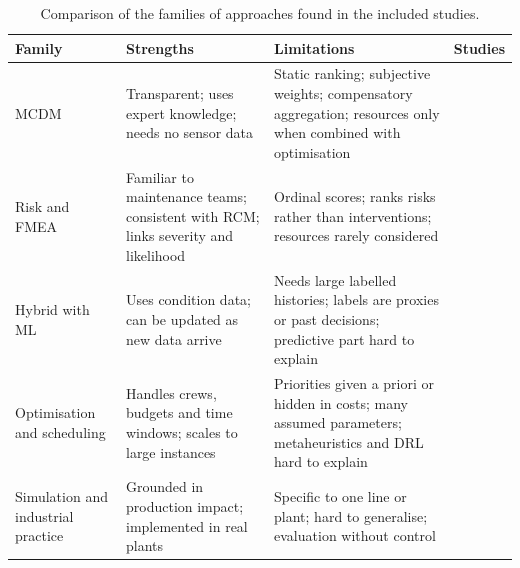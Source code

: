 \begin{table}[!htbp]
\centering
\caption{Comparison of the families of approaches found in the included studies.}
\label{tab:families}
\scriptsize
\begin{tabular}{|>{\raggedright\arraybackslash}p{1.6cm}|>{\raggedright\arraybackslash}p{3.1cm}|>{\raggedright\arraybackslash}p{3.3cm}|>{\raggedright\arraybackslash}p{2.4cm}|}
\hline
\textbf{Family} & \textbf{Strengths} & \textbf{Limitations} & \textbf{Studies} \\
\hline
MCDM & Transparent; uses expert knowledge; needs no sensor data & Static ranking; subjective weights; compensatory aggregation; resources only when combined with optimisation & \cite{ozcan2021,bulut2021,panwar2021,bahrami2021,enjavimadar2022,moradi2024,rios2025} \\
\hline
Risk and FMEA & Familiar to maintenance teams; consistent with RCM; links severity and likelihood & Ordinal scores; ranks risks rather than interventions; resources rarely considered & \cite{bahadir2026,qiu2026,shaulagara2023,zhou2024,hedayatnia2025} \\
\hline
Hybrid with ML & Uses condition data; can be updated as new data arrive & Needs large labelled histories; labels are proxies or past decisions; predictive part hard to explain & \cite{tang2026,darko2026,astepe2021,wehbi2026,danach2026,rios2024,wittbrodt2026} \\
\hline
Optimisation and scheduling & Handles crews, budgets and time windows; scales to large instances & Priorities given a priori or hidden in costs; many assumed parameters; metaheuristics and DRL hard to explain & \cite{schulze2022,geng2022,woller2023,gao2024,bi2022,dui2025,dui2026,li2027} \\
\hline
Simulation and industrial practice & Grounded in production impact; implemented in real plants & Specific to one line or plant; hard to generalise; evaluation without control & \cite{yang2021,gopalakrishnan2022,delgado2026,hall2021} \\
\hline
\end{tabular}
\end{table}

